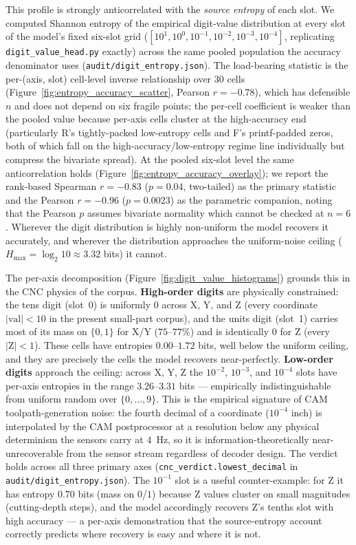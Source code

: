 \documentclass[sensors,article,submit,moreauthors,pdftex]{Definitions/mdpi}
\begin{document}
This profile is strongly anticorrelated with the \emph{source entropy} of each slot. We computed Shannon entropy of the empirical digit-value distribution at every slot of the model's fixed six-slot grid ($[10^{1}, 10^{0}, 10^{-1}, 10^{-2}, 10^{-3}, 10^{-4}]$, replicating \texttt{digit\_value\_head.py} exactly) across the same pooled population the accuracy denominator uses (\texttt{audit/digit\_entropy.json}). The load-bearing statistic is the per-(axis, slot) cell-level inverse relationship over 30 cells (Figure~\ref{fig:entropy_accuracy_scatter}, Pearson $r = -0.78$), which has defensible $n$ and does not depend on six fragile points; the per-cell coefficient is weaker than the pooled value because per-axis cells cluster at the high-accuracy end (particularly R's tightly-packed low-entropy cells and F's printf-padded zeros, both of which fall on the high-accuracy/low-entropy regime line individually but compress the bivariate spread). At the pooled six-slot level the same anticorrelation holds (Figure~\ref{fig:entropy_accuracy_overlay}); we report the rank-based Spearman $r = -0.83$ ($p = 0.04$, two-tailed) as the primary statistic and the Pearson $r = -0.96$ ($p = 0.0023$) as the parametric companion, noting that the Pearson $p$ assumes bivariate normality which cannot be checked at $n=6$. Wherever the digit distribution is highly non-uniform the model recovers it accurately, and wherever the distribution approaches the uniform-noise ceiling ($H_{\max} = \log_2 10 \approx 3.32$ bits) it cannot.

The per-axis decomposition (Figure~\ref{fig:digit_value_histograms}) grounds this in the CNC physics of the corpus. \textbf{High-order digits} are physically constrained: the tens digit (slot~0) is uniformly $0$ across X, Y, and Z (every coordinate $|\text{val}| < 10$ in the present small-part corpus), and the units digit (slot~1) carries most of its mass on $\{0, 1\}$ for X/Y ($75$--$77\%$) and is identically $0$ for Z (every $|\text{Z}|<1$). These cells have entropies $0.00$--$1.72$ bits, well below the uniform ceiling, and they are precisely the cells the model recovers near-perfectly. \textbf{Low-order digits} approach the ceiling: across X, Y, Z the $10^{-2}$, $10^{-3}$, and $10^{-4}$ slots have per-axis entropies in the range $3.26$--$3.31$ bits --- empirically indistinguishable from uniform random over $\{0,\ldots,9\}$. This is the empirical signature of CAM toolpath-generation noise: the fourth decimal of a coordinate ($10^{-4}$ inch) is interpolated by the CAM postprocessor at a resolution below any physical determinism the sensors carry at $4$~Hz, so it is information-theoretically near-unrecoverable from the sensor stream regardless of decoder design. The verdict holds across all three primary axes (\texttt{cnc\_verdict.lowest\_decimal} in \texttt{audit/digit\_entropy.json}). The $10^{-1}$ slot is a useful counter-example: for Z it has entropy $0.70$ bits (mass on $0$/$1$) because Z values cluster on small magnitudes (cutting-depth steps), and the model accordingly recovers Z's tenths slot with high accuracy --- a per-axis demonstration that the source-entropy account correctly predicts where recovery is easy and where it is not.
\end{document}
